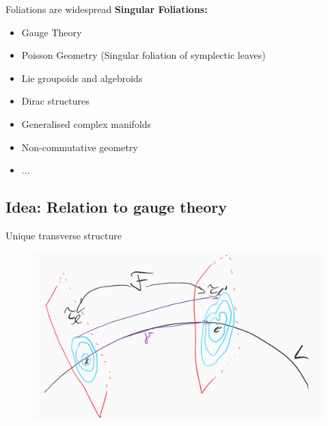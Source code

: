 \documentclass[
aspectratio=3218, 
10pt
]{beamer}
\theoremstyle{plain}
\theoremstyle{remark}
\begin{document}
{{
\begin{frame}{Foliations are widespread}
\textbf{Singular Foliations:}

\begin{itemize}
	\item Gauge Theory
	\item Poisson Geometry \newline (Singular foliation of symplectic leaves)
	\item Lie groupoids and algebroids
	\item Dirac structures
	\item Generalised complex manifolds
	\item Non-commutative geometry
	\item $\dotsc$
\end{itemize}

\end{frame}
}




\subsection{Idea: Relation to gauge theory}


\begin{frame}{Unique transverse structure}
\begin{figure}[htbp]
	\centering
		\includegraphics[width=.8\textwidth]{Foliation connection.png}
	\label{fig:Foliation connection}
\end{figure}

\end{frame}


}
\end{document}
